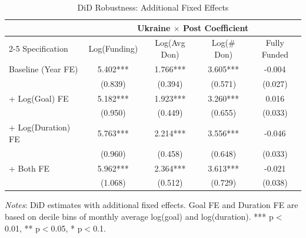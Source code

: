 \begin{table}[htbp]
\centering
\caption{DiD Robustness: Additional Fixed Effects}
\label{tab:did_fe}
\begin{threeparttable}
\small
\begin{tabular}{lcccc}
\toprule
& \multicolumn{4}{c}{Ukraine $\times$ Post Coefficient} \\
\cmidrule(lr){2-5}
Specification & Log(Funding) & Log(Avg Don) & Log(\# Don) & Fully Funded \\
\midrule
Baseline (Year FE) & 5.402*** & 1.766*** & 3.605*** & -0.004 \\
& (0.839) & (0.394) & (0.571) & (0.027) \\
+ Log(Goal) FE & 5.182*** & 1.923*** & 3.260*** & 0.016 \\
& (0.950) & (0.449) & (0.655) & (0.033) \\
+ Log(Duration) FE & 5.763*** & 2.214*** & 3.556*** & -0.046 \\
& (0.960) & (0.458) & (0.648) & (0.033) \\
+ Both FE & 5.962*** & 2.364*** & 3.613*** & -0.021 \\
& (1.068) & (0.512) & (0.729) & (0.038) \\
\bottomrule
\end{tabular}
\begin{tablenotes}
\small
\item \textit{Notes}: DiD estimates with additional fixed effects. Goal FE and Duration FE are based on decile bins of monthly average log(goal) and log(duration). *** p$<$0.01, ** p$<$0.05, * p$<$0.1.
\end{tablenotes}
\end{threeparttable}
\end{table}

